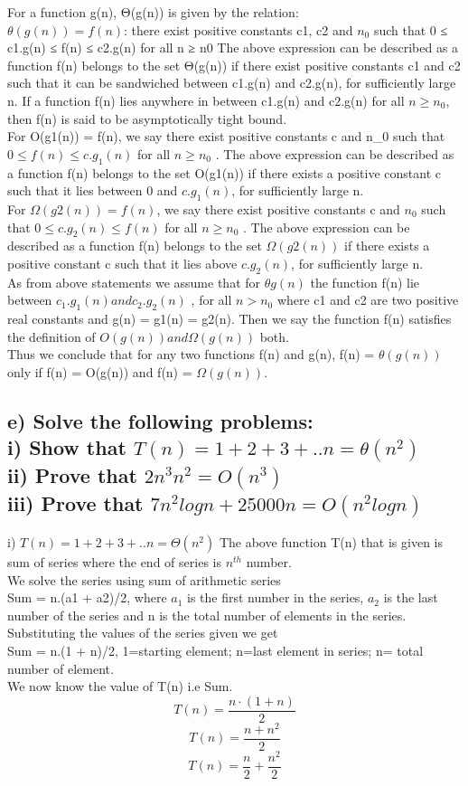 \documentclass[11pt]{article}
\begin{document}
For a function g(n), Θ(g(n)) is given by the relation:\\
$\theta(g(n)) = f(n)$: there exist positive constants c1, c2 and ${n_0}$ such that
0 ≤ c1.g(n) ≤ f(n) ≤ c2.g(n) for all n ≥ n0 The above expression can be
described as a function f(n) belongs to the set Θ(g(n)) if there exist positive
constants c1 and c2 such that it can be sandwiched between c1.g(n) and
c2.g(n), for sufficiently large n.
If a function f(n) lies anywhere in between c1.g(n) and c2.g(n) for all 
$n \geq n_0$, then f(n) is said to be asymptotically tight bound.\\
For O(g1(n)) = f(n), we say there exist positive constants c and {n_0} such that $0 \leq f(n) \leq c.g_1(n)$ for all $n \geq n_0$ . The above expression can be described as a function f(n) belongs to the set O(g1(n)) if there exists a positive constant c such that it lies between 0 and $c.g_1(n)$, for sufficiently large n.\\
For $\Omega(g2(n)) = f(n)$, we say there exist positive constants c and $n_0$ such that $0 \leq c.g_2(n) \leq f(n)$ for all $n \geq n_0$ . The above expression can be described as a function f(n) belongs to the set $\Omega(g2(n))$ if there exists a positive constant c such that it lies above $c.g_2(n)$, for sufficiently large n.\\
As from above statements we assume that for $\theta g(n)$ the function f(n) lie between $c_1.g_1(n) and c_2.g_2(n)$ , for all $n > n_0$ where c1 and c2 are two positive real constants and g(n) = g1(n) = g2(n). Then we say the function f(n) satisfies the definition of $O(g(n)) and \Omega(g(n))$ both. \\
Thus we conclude that for any two functions f(n) and g(n), f(n) = $\theta(g(n))$ only if f(n) = O(g(n)) and f(n) = $\Omega(g(n))$.

\subsection{e) Solve the following problems: \\
i) Show that $T(n) = 1 + 2 + 3 + ..n = \theta(n^2)$ \\
ii) Prove that $2n^3n^2 = O(n^3)$ \\
iii) Prove that $7n^2log n + 25000n = O(n^2log n)$  }

i) $T(n) = 1 + 2 + 3 + ..n = \Theta(n^2)$
The above function T(n) that is given is sum of series where the end of series is ${n^{th}}$ number.\\ We solve the series using sum of arithmetic series\\
Sum = n.(a1 + a2)/2, where $a_1$ is the first number in the series, $a_2$ is the last number of the series and n is the total number of elements in the series.\\
Substituting the values of the series given we get\\
Sum = n.(1 + n)/2, 1=starting element; n=last element in series;
n= total number of element.\\
We now know the value of T(n) i.e Sum.
\[ T(n) = \frac{n \cdot (1 + n)}{2} \]
\[ T(n) = \frac{n + n^2}{2} \]
\[ T(n) = \frac{n}{2} + \frac{n^2}{2} \]
\end{document}
